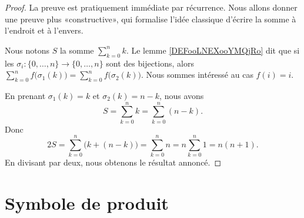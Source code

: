 \begin{proof}
	La preuve est pratiquement immédiate par récurrence. Nous allons donner une preuve plus «constructive», qui formalise l'idée classique d'écrire la somme à l'endroit et à l'envers.


	Nous notons \( S\) la somme \( \sum_{k=0}^nk\). Le lemme \ref{DEFooLNEXooYMQjRo} dit que si les \( \sigma_i\colon \{ 0,\ldots, n \}\to \{ 0,\ldots, n \}\) sont des bijections, alors \( \sum_{k=0}^nf\big( \sigma_1(k) \big)=\sum_{k=0}^nf\big( \sigma_2(k) \big)\). Nous sommes intéressé au cas \( f(i)=i\).

	En prenant \( \sigma_1(k)=k\) et \( \sigma_2(k)=n-k\), nous avons
	\begin{equation}
		S=\sum_{k=0}^nk=\sum_{k=0}^n(n-k).
	\end{equation}
	Donc
	\begin{equation}
		2S=\sum_{k=0}^n\big( k+(n-k) \big)=\sum_{k=0}^nn=n\sum_{k=0}^n1=n(n+1).
	\end{equation}
	En divisant par deux, nous obtenons le résultat annoncé.
\end{proof}


\section{Symbole de produit}

